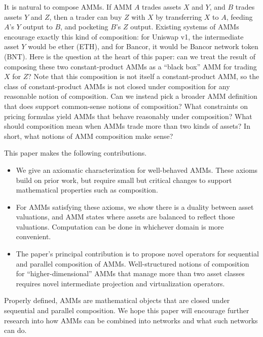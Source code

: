 It is natural to compose AMMs.
If AMM $A$ trades assets $X$ and $Y$,
and $B$ trades assets $Y$ and $Z$,
then a trader can buy $Z$ with $X$ by transferring $X$ to $A$,
feeding $A$'s $Y$ output to $B$, and pocketing $B$'s $Z$ output.
Existing systems of AMMs encourage exactly this kind of composition:
for Uniswap v1, the intermediate asset $Y$ would be ether (ETH),
and for Bancor, it would be Bancor network token (BNT).
Here is the question at the heart of this paper:
can we treat the result of composing these two constant-product AMMs
as a ``black box'' AMM for trading $X$ for $Z$?
Note that this composition is not itself a constant-product AMM,
so the class of constant-product AMMs is not closed under
composition for any reasonable notion of composition.
Can we instead pick a broader AMM definition that does support
common-sense notions of composition?
What constraints on pricing formulas yield AMMs that behave reasonably under composition?
What should composition mean when AMMs trade more than two kinds of assets?
In short, what notions of AMM composition make sense?

This paper makes the following contributions.
\begin{itemize}
\item 
We give an axiomatic characterization for well-behaved AMMs.
These axioms build on prior work,
but require small but critical changes to support
mathematical properties such as composition.

\item
For AMMs satisfying these axioms,
we show there is a duality between asset valuations,
and AMM states where assets are balanced to reflect those valuations.
Computation can be done in whichever domain is more convenient.

\item
The paper's principal contribution is to
propose novel operators for sequential and parallel
composition of AMMs.
Well-structured notions of composition for
``higher-dimensional'' AMMs that manage more than two asset classes
requires novel intermediate projection and virtualization operators.
\end{itemize}
Properly defined,
AMMs are mathematical objects that are closed under sequential and parallel composition.
We hope this paper will encourage further research into how AMMs can be combined
into networks and what such networks can do.

